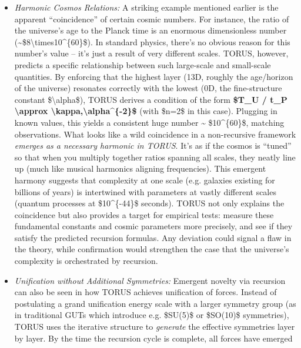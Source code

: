 \documentclass[
]{article}
\begin{document}
{\begin{itemize}
\item
  \emph{Harmonic Cosmos Relations:} A striking example mentioned earlier
  is the apparent ``coincidence'' of certain cosmic numbers. For
  instance, the ratio of the universe's age to the Planck time is an
  enormous dimensionless number
  (\textasciitilde\$8\textbackslash times10\^{}\{60\}\$). In standard
  physics, there's no obvious reason for this number's value -- it's
  just a result of very different scales. TORUS, however, predicts a
  specific relationship between such large-scale and small-scale
  quantities. By enforcing that the highest layer (13D, roughly the
  age/horizon of the universe) resonates correctly with the lowest (0D,
  the fine-structure constant \$\textbackslash alpha\$), TORUS derives a
  condition of the form \textbf{\$T\_U / t\_P \textbackslash approx
  \textbackslash kappa,\textbackslash alpha\^{}\{-2\}\$} (with \$n=2\$
  in this case)\hspace{0pt}. Plugging in known values, this yields a
  consistent huge number \textasciitilde{} \$10\^{}\{60\}\$, matching
  observations. What looks like a wild coincidence in a non-recursive
  framework \emph{emerges as a necessary harmonic in TORUS}. It's as if
  the cosmos is ``tuned'' so that when you multiply together ratios
  spanning all scales, they neatly line up (much like musical harmonics
  aligning frequencies). This emergent harmony suggests that complexity
  at one scale (e.g. galaxies existing for billions of years) is
  intertwined with parameters at vastly different scales (quantum
  processes at \$10\^{}\{-44\}\$ seconds). TORUS not only explains the
  coincidence but also provides a target for empirical tests: measure
  these fundamental constants and cosmic parameters more precisely, and
  see if they satisfy the predicted recursion formulas\hspace{0pt}. Any
  deviation could signal a flaw in the theory, while confirmation would
  strengthen the case that the universe's complexity is orchestrated by
  recursion.
\item
  \emph{Unification without Additional Symmetries:} Emergent novelty via
  recursion can also be seen in how TORUS achieves unification of
  forces. Instead of postulating a grand unification energy scale with a
  larger symmetry group (as in traditional GUTs which introduce e.g.
  \$SU(5)\$ or \$SO(10)\$ symmetries), TORUS uses the iterative
  structure to \emph{generate} the effective symmetries layer by layer.
  By the time the recursion cycle is complete, all forces have emerged

\end{itemize}}
\end{document}
